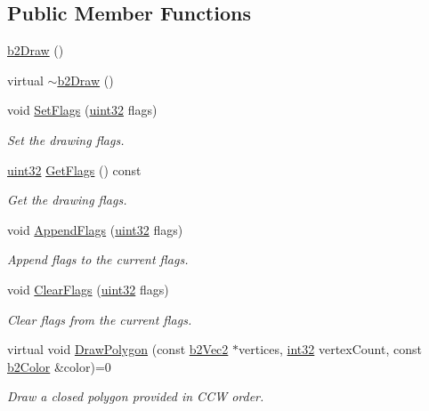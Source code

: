 \subsection*{Public Member Functions}
\begin{DoxyCompactItemize}
\item 
\mbox{\hyperlink{classb2_draw_a399975bcd0f9994d6a9d523d87f28fc8}{b2\+Draw}} ()
\item 
virtual \mbox{\hyperlink{classb2_draw_ad5003ecc3b483f4e008422a0fe8b20ad}{$\sim$b2\+Draw}} ()
\item 
void \mbox{\hyperlink{classb2_draw_ac2bbe31595478690e44de4ff1e7f347e}{Set\+Flags}} (\mbox{\hyperlink{b2_settings_8h_a1134b580f8da4de94ca6b1de4d37975e}{uint32}} flags)
\begin{DoxyCompactList}\small\item\em Set the drawing flags. \end{DoxyCompactList}\item 
\mbox{\hyperlink{b2_settings_8h_a1134b580f8da4de94ca6b1de4d37975e}{uint32}} \mbox{\hyperlink{classb2_draw_a10926d67ad6d3a2517197c4f10923700}{Get\+Flags}} () const
\begin{DoxyCompactList}\small\item\em Get the drawing flags. \end{DoxyCompactList}\item 
void \mbox{\hyperlink{classb2_draw_acc2fd4648ee0a65574770c64528f7166}{Append\+Flags}} (\mbox{\hyperlink{b2_settings_8h_a1134b580f8da4de94ca6b1de4d37975e}{uint32}} flags)
\begin{DoxyCompactList}\small\item\em Append flags to the current flags. \end{DoxyCompactList}\item 
void \mbox{\hyperlink{classb2_draw_afc240b71f4ba8c17440d6ed526d4e22e}{Clear\+Flags}} (\mbox{\hyperlink{b2_settings_8h_a1134b580f8da4de94ca6b1de4d37975e}{uint32}} flags)
\begin{DoxyCompactList}\small\item\em Clear flags from the current flags. \end{DoxyCompactList}\item 
virtual void \mbox{\hyperlink{classb2_draw_acd5427d1d2e7d19f1b34ad3620134d28}{Draw\+Polygon}} (const \mbox{\hyperlink{structb2_vec2}{b2\+Vec2}} $\ast$vertices, \mbox{\hyperlink{b2_settings_8h_a43d43196463bde49cb067f5c20ab8481}{int32}} vertex\+Count, const \mbox{\hyperlink{structb2_color}{b2\+Color}} \&color)=0
\begin{DoxyCompactList}\small\item\em Draw a closed polygon provided in C\+CW order. \end{DoxyCompactList}\item 

\end{DoxyCompactItemize}
